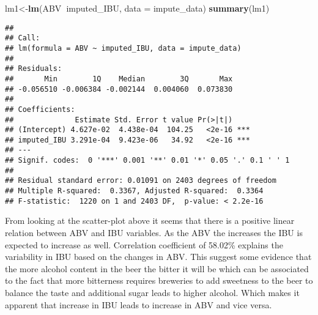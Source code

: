 \documentclass[]{article}
\newenvironment{Shaded}{\begin{snugshade}}{\end{snugshade}}
\newcommand{\DataTypeTok}[1]{\textcolor[rgb]{0.13,0.29,0.53}{#1}}
\newcommand{\KeywordTok}[1]{\textcolor[rgb]{0.13,0.29,0.53}{\textbf{#1}}}
\newcommand{\NormalTok}[1]{#1}
\newcommand{\OperatorTok}[1]{\textcolor[rgb]{0.81,0.36,0.00}{\textbf{#1}}}
\begin{document}
\begin{Shaded}
\begin{Highlighting}[]
\NormalTok{lm1<-}\KeywordTok{lm}\NormalTok{(ABV}\OperatorTok{~}\NormalTok{imputed_IBU, }\DataTypeTok{data =}\NormalTok{ impute_data)}
\KeywordTok{summary}\NormalTok{(lm1)}
\end{Highlighting}
\end{Shaded}

\begin{verbatim}
## 
## Call:
## lm(formula = ABV ~ imputed_IBU, data = impute_data)
## 
## Residuals:
##       Min        1Q    Median        3Q       Max 
## -0.056510 -0.006384 -0.002144  0.004060  0.073830 
## 
## Coefficients:
##              Estimate Std. Error t value Pr(>|t|)    
## (Intercept) 4.627e-02  4.438e-04  104.25   <2e-16 ***
## imputed_IBU 3.291e-04  9.423e-06   34.92   <2e-16 ***
## ---
## Signif. codes:  0 '***' 0.001 '**' 0.01 '*' 0.05 '.' 0.1 ' ' 1
## 
## Residual standard error: 0.01091 on 2403 degrees of freedom
## Multiple R-squared:  0.3367, Adjusted R-squared:  0.3364 
## F-statistic:  1220 on 1 and 2403 DF,  p-value: < 2.2e-16
\end{verbatim}

From looking at the scatter-plot above it seems that there is a positive
linear relation between ABV and IBU variables. As the ABV the increases
the IBU is expected to increase as well. Correlation coefficient of
58.02\% explains the variability in IBU based on the changes in ABV.
This suggest some evidence that the more alcohol content in the beer the
bitter it will be which can be associated to the fact that more
bitterness requires breweries to add sweetness to the beer to balance
the taste and additional sugar leads to higher alcohol. Which makes it
apparent that increase in IBU leads to increase in ABV and vice versa.
\end{document}
